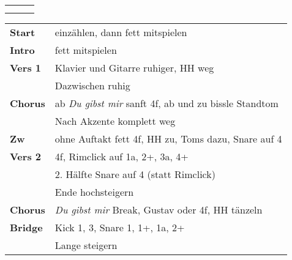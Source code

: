 

\begin{tabular}{p{0.6cm}p{12cm}p{1.4cm}}
	\rowcolor{cyan} \myRow{\thesongnumber} & \myRow{Neues Leben} & \myRow{157} \\
	                                       &                     &             \\
\end{tabular}

\begin{tabular}{p{1.6cm}l}
	\textbf{Start}  & einzählen, dann fett mitspielen                                           \\
	\textbf{Intro}  & fett mitspielen                                                           \\
	\textbf{Vers 1} & Klavier und Gitarre ruhiger, HH weg                                       \\
	                & Dazwischen ruhig                                                          \\
	\textbf{Chorus} & ab \textit{Du gibst mir} sanft 4f, ab und zu bissle Standtom              \\
	                & Nach Akzente komplett weg                                                 \\
	\textbf{Zw}     & ohne Auftakt fett 4f, HH zu, Toms dazu, Snare auf 4                       \\
	\textbf{Vers 2} & 4f, Rimclick auf 1a, 2+, 3a, 4+                                           \\
	                & 2. Hälfte Snare auf 4 (statt Rimclick)                                    \\
	                & Ende hochsteigern                                                         \\
	\textbf{Chorus} & \textit{Du gibst mir} Break, Gustav oder 4f, HH tänzeln                   \\
	\textbf{Bridge} & Kick 1, 3, Snare 1, 1+, 1a, 2+                                            \\
	                & Lange steigern                                                            \\

\end{tabular}

